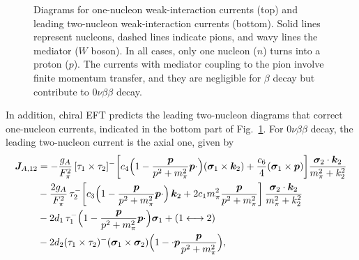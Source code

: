 \begin{figure}[t]
\begin{center}
		\caption{Diagrams for one-nucleon weak-interaction currents (top) and leading two-nucleon weak-interaction currents (bottom). Solid lines represent nucleons, dashed lines indicate pions, and wavy lines the mediator ($W$ boson). In all cases, only one nucleon ($n$) turns into a proton ($p$). The currents with mediator coupling to the pion involve finite momentum transfer, and they are negligible for $\beta$ decay but contribute to $0\nu\beta\beta$ decay. %
  \label{fig:currents}}
	\end{center}
\end{figure}

In addition, chiral EFT predicts the leading two-nucleon diagrams that correct one-nucleon currents, indicated in the bottom part of Fig.~\ref{fig:currents}. For $0\nu\beta\beta$ decay, the leading two-nucleon current is the axial one, given by~\cite{Park:2002yp,Krebs:2016rqz,Baroni:2015uza}
\begin{align}
\label{eq:axial2bc}
\bm J_{A,12} &= -\frac{g_A}{F^2_\pi} \, [\tau_1\times\tau_2]^-
\biggl[ 
c_4\Bigl(1-\frac{\bm p}{p^2+m_\pi^2}{\bm p\cdot}\Bigr)
(\bm \sigma_1\times\bm k_2)+\frac{c_6}{4}
(\bm \sigma_1\times \bm p) 
 \biggr]
\frac{\bm \sigma_2\cdot\bm k_2}{m_\pi^2+k_2^2}  \nonumber \\
&-\frac{2g_A}{F^2_\pi} \,\tau_2^-
\biggl[c_3 \Bigl(1-\frac{\bm p}{p^2+m_\pi^2}{\bm p\cdot}\Bigr) \,\bm k_2+2c_1 m_\pi^2 \frac{\bm p}{p^2+m_\pi^2} \biggr]  \, \frac{
	\bm \sigma_2\cdot\bm k_2}{m_\pi^2+k_2^2}  \nonumber \\
&- 2d_1 \,\tau_1^-  \Bigl(1-\frac{\bm p}{p^2+m_\pi^2}{\bm p\cdot}\Bigr)
\bm \sigma_1 +(1\longleftrightarrow2) \nonumber \\
&- 2d_2 (\tau_1\times\tau_2)^- (\bm \sigma_1 \times \bm \sigma_2)
\Bigl(1-{\cdot \bm p}\frac{\bm p}{p^2+m_\pi^2}\Bigr),
\end{align}
